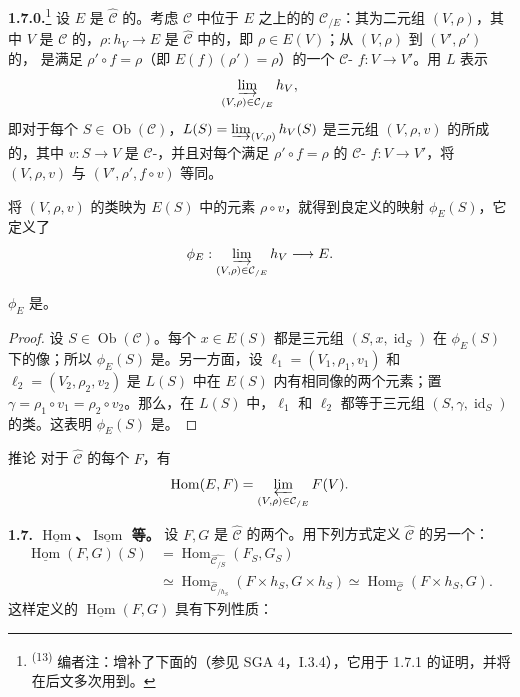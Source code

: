 \textbf{1.7.0.}\footnote{\textsuperscript{(13)} 编者注：增补了下面的（参见 SGA 4，I.3.4），它用于 1.7.1 的证明，并将在后文多次用到。}
设 $E$ 是 $\widehat{\mathcal C}$ 的。考虑 $\mathcal C$ 中位于 $E$ 之上的的 $\mathcal C_{/E}$：其为二元组 $(V,\rho)$，其中 $V$ 是 $\mathcal C$ 的，$\rho:h_V\to E$ 是 $\widehat{\mathcal C}$ 中的，即 $\rho\in E(V)$；从 $(V,\rho)$ 到 $(V',\rho')$ 的，
是满足 $\rho'\circ f=\rho$（即 $E(f)(\rho')=\rho$）的一个 $\mathcal C$- $f:V\to V'$。用 $L$ 表示
\[
\varinjlim_{(V,\rho)\in\mathcal C_{/E}}h_V,
\]
即对于每个 $S\in\operatorname{Ob}(\mathcal C)$，$L(S)=\varinjlim_{(V,\rho)}h_V(S)$ 是三元组 $(V,\rho,v)$ 的所成的，其中 $v:S\to V$ 是 $\mathcal C$-，并且对每个满足 $\rho'\circ f=\rho$ 的 $\mathcal C$- $f:V\to V'$，将 $(V,\rho,v)$ 与 $(V',\rho',f\circ v)$ 等同。

将 $(V,\rho,v)$ 的类映为 $E(S)$ 中的元素 $\rho\circ v$，就得到良定义的映射 $\phi_E(S)$，它定义了
\[
\phi_E:\varinjlim_{(V,\rho)\in\mathcal C_{/E}}h_V\longrightarrow E.
\]
\begin{SGAresult}{}{}
$\phi_E$ 是。
\end{SGAresult}
\begin{proof}
设 $S\in\operatorname{Ob}(\mathcal C)$。每个 $x\in E(S)$ 都是三元组 $(S,x,\operatorname{id}_S)$ 在 $\phi_E(S)$ 下的像；所以 $\phi_E(S)$ 是。另一方面，设 $\ell_1=(V_1,\rho_1,v_1)$ 和 $\ell_2=(V_2,\rho_2,v_2)$ 是 $L(S)$ 中在 $E(S)$ 内有相同像的两个元素；置 $\gamma=\rho_1\circ v_1=\rho_2\circ v_2$。那么，在 $L(S)$ 中，$\ell_1$ 和 $\ell_2$ 都等于三元组 $(S,\gamma,\operatorname{id}_S)$ 的类。这表明 $\phi_E(S)$ 是。
\end{proof}
\begin{SGAresult}{推论}{}
对于 $\widehat{\mathcal C}$ 的每个 $F$，有
\[
\operatorname{Hom}(E,F)=\varprojlim_{(V,\rho)\in\mathcal C_{/E}}F(V).
\]
\end{SGAresult}

\textbf{1.7. $\underline{\operatorname{Hom}}$、$\underline{\operatorname{Isom}}$ 等。}
设 $F,G$ 是 $\widehat{\mathcal C}$ 的两个。用下列方式定义 $\widehat{\mathcal C}$ 的另一个：
\[
\begin{aligned}
\underline{\operatorname{Hom}}(F,G)(S)
&=\operatorname{Hom}_{\widehat{\mathcal C_{/S}}}(F_S,G_S)\\
&\simeq\operatorname{Hom}_{\widehat{\mathcal C}_{/h_S}}(F\times h_S,G\times h_S)
\simeq\operatorname{Hom}_{\widehat{\mathcal C}}(F\times h_S,G).
\end{aligned}
\]
这样定义的 $\underline{\operatorname{Hom}}(F,G)$ 具有下列性质：


